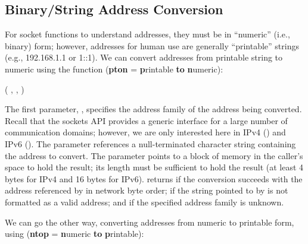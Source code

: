 

\subsection{Binary/String Address Conversion}

For socket functions to understand addresses, they must be in
``numeric'' (i.e., binary) form; however, addresses for human use are generally
``printable'' strings (e.g., 192.168.1.1 or 1::1).  We can convert addresses
from printable string to numeric using the 
function (\textbf{pton} = \textbf{p}rintable \textbf{to} \textbf{n}umeric):

\begin{inlinefcn}
 ( , 
, )
\end{inlinefcn}

\noindent The first parameter, , specifies the
address family of the address being converted.
Recall that the sockets API provides a generic
interface for a large number of communication domains; however,
we are only interested here
in IPv4 () and IPv6 (). 
The  parameter references a null-terminated character string
containing the address to convert.  The  parameter points
to a block of memory in the caller's space to hold the result; its
length must be sufficient to hold the result (at least 4 bytes for IPv4 and 16
bytes for IPv6).
%
 returns  if the conversion
succeeds with the address referenced by  in network byte
order;  if the string pointed to by  is not
formatted as a valid address;
and  if the specified address family is unknown.

We can go the other way, converting addresses from numeric to
printable form, using 
(\textbf{ntop} = \textbf{n}umeric \textbf{to} \textbf{p}rintable):

